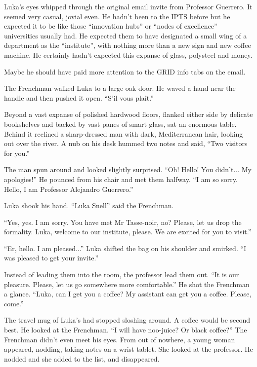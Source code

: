 \documentclass[ebook,11pt,oneside,openany]{memoir}
\newcommand{\scenechange}{
  \par
  \vspace{\baselineskip}
  \par
\noindent}
\begin{document}
Luka's eyes whipped through the original email invite from Professor Guerrero. It seemed very casual, jovial even. He hadn't been to the IPTS before but he expected it to be like those ``innovation hubs'' or ``nodes of excellence'' universities usually had. He expected them to have designated a small wing of a department as the ``institute'', with nothing more than a new sign and new coffee machine. He certainly hadn't expected this expanse of glass, polysteel and money.

Maybe he should have paid more attention to the GRID info tabs on the email.

\scenechange

The Frenchman walked Luka to a large oak door. He waved a hand near the handle and then pushed it open. ``S'il vous plaît.''

Beyond a vast expanse of polished hardwood floors, flanked either side by delicate bookshelves and backed by vast panes of smart glass, sat an enormous table. Behind it reclined a sharp-dressed man with dark, Mediterranean hair, looking out over the river. A nub on his desk hummed two notes and said, ``Two visitors for you.''

The man spun around and looked slightly surprised. ``Oh! Hello! You didn't... My apologies!'' He pounced from his chair and met them halfway. ``I am so sorry. Hello, I am Professor Alejandro Guerrero.''

Luka shook his hand. ``Luka Snell'' said the Frenchman.

``Yes, yes. I am sorry. You have met Mr Tasse-noir, no? Please, let us drop the formality. Luka, welcome to our institute, please. We are excited for you to visit.''

``Er, hello. I am pleased...'' Luka shifted the bag on his shoulder and smirked. ``I was pleased to get your invite.''

Instead of leading them into the room, the professor lead them out. ``It is our pleasure. Please, let us go somewhere more comfortable.'' He shot the Frenchman a glance. ``Luka, can I get you a coffee? My assistant can get you a coffee. Please, come.''

The travel mug of Luka's had stopped sloshing around. A coffee would be second best. He looked at the Frenchman. ``I will have noo-juice? Or black coffee?'' The Frenchman didn't even meet his eyes. From out of nowhere, a young woman appeared, nodding, taking notes on a wrist tablet. She looked at the professor. He nodded and she added to the list, and disappeared.
\end{document}

